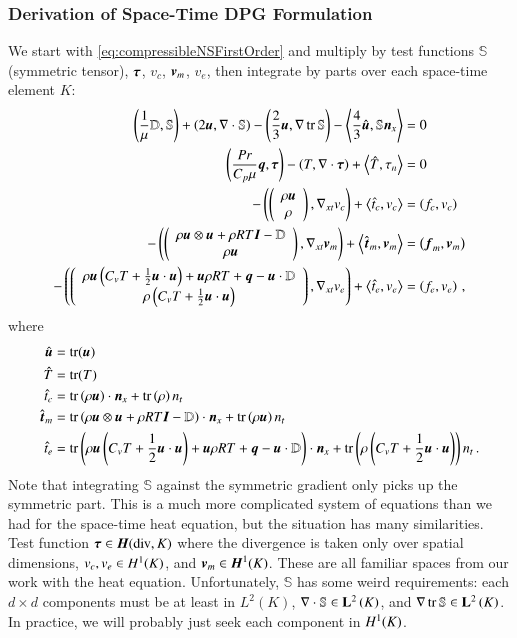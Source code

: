 \documentclass[preprint,12pt]{elsarticle}
\begin{document}
\subsubsection{Derivation of Space-Time DPG Formulation}
We start with \eqref{eq:compressibleNSFirstOrder} and multiply by test functions $\mathbb{S}$ (symmetric tensor), $\boldsymbol\tau$, $v_c$, $\boldsymbol v_m$, $v_e$, 
then integrate by parts over each space-time element $K$:
\begin{subequations}
\label{eq:compressibleNSBF}
\begin{align}
	\left( \frac{1}{\mu}\mathbb{D},\mathbb{S} \right)+\left( 2\boldsymbol u,\nabla\cdot\mathbb{S} \right)-\left( \frac{2}{3}\boldsymbol u,\nabla\operatorname*{tr}{\mathbb{S}} \right)
	-\left\langle \frac{4}{3}\hat{\boldsymbol u},\mathbb{S}\boldsymbol n_x \right\rangle&=0\\
	\left( \frac{Pr}{C_p\mu}\boldsymbol q,\boldsymbol\tau \right)-\left( T,\nabla\cdot\boldsymbol\tau \right)+\left\langle \hat T,\tau_n \right\rangle&=0\\
	-\left( \left( \begin{array}{c} \rho\boldsymbol u\\ \rho\\ \end{array} \right),\nabla_{xt} v_c \right)+\left\langle \hat t_c,v_c \right\rangle&=\left( f_c,v_c \right)\\
	-\left( \left( \begin{array}{c} \rho\boldsymbol u\otimes\boldsymbol u+\rho RT\boldsymbol I-\mathbb{D}\\ \rho\boldsymbol u\\ \end{array} \right),\nabla_{xt}\boldsymbol v_m \right)+\left\langle \hat{\boldsymbol t}_m,\boldsymbol v_m \right\rangle&=\left( \boldsymbol f_m,\boldsymbol v_m \right)\\
	-\left( \left( \begin{array}{c} \rho\boldsymbol u\left( C_v T+\frac{1}{2}\boldsymbol u\cdot\boldsymbol u \right)+\boldsymbol u\rho RT+\boldsymbol q-\boldsymbol u\cdot\mathbb{D}\\ \rho\left( C_v T+\frac{1}{2}\boldsymbol u\cdot\boldsymbol u \right)\\ \end{array} \right),\nabla_{xt} v_e \right)
	+\left\langle \hat t_e,v_e \right\rangle&=\left( f_e,v_e \right)\,,
\end{align}
\end{subequations}
where 
\begin{equation*}
\begin{aligned}
\hat{\boldsymbol u}&=\operatorname*{tr}(\boldsymbol u)\\
\hat T&=\operatorname*{tr}(T)\\
\hat t_c&=\operatorname*{tr}\left( \rho\boldsymbol u \right)\cdot\boldsymbol n_x
+\operatorname*{tr}\left( \rho \right)n_t\\
\hat{\boldsymbol t}_m&=\operatorname*{tr}\left( \rho\boldsymbol u\otimes\boldsymbol u+\rho RT\boldsymbol I-\mathbb{D} \right)\cdot\boldsymbol n_x
+\operatorname*{tr}\left( \rho\boldsymbol u \right) n_t\\
\hat t_e&=\operatorname*{tr}\left( \rho\boldsymbol u\left( C_v T+\frac{1}{2}\boldsymbol u\cdot\boldsymbol u \right)+\boldsymbol u\rho RT+\boldsymbol q-\boldsymbol u\cdot\mathbb{D} \right)\cdot\boldsymbol n_x
+\operatorname*{tr}\left( \rho\left( C_v T+\frac{1}{2}\boldsymbol u\cdot\boldsymbol u \right) \right)n_t\,.
\end{aligned}
\end{equation*}
Note that integrating $\mathbb{S}$ against the symmetric gradient only picks up the symmetric part.
This is a much more complicated system of equations than we had for the space-time heat equation, but the situation has many similarities.
Test function $\boldsymbol\tau\in\mbox{\boldmath $H$}(\text{div},K)$ where the divergence is taken only over spatial dimensions, $v_c,v_e\in H^{1}(K)$, and $\boldsymbol v_m\in\mbox{\boldmath $H$}^{1}(K)$.
These are all familiar spaces from our work with the heat equation.
Unfortunately, $\mathbb{S}$ has some weird requirements: each $d\times d$ components must be at least in $L^2(K)$, $\nabla\cdot\mathbb{S}\in\mathbf{L}^2\left( K \right)$, and
$\nabla\operatorname*{tr}{\mathbb{S}}\in\mathbf{L}^2\left( K \right)$.
In practice, we will probably just seek each component in $H^{1}(K)$.
\end{document}
